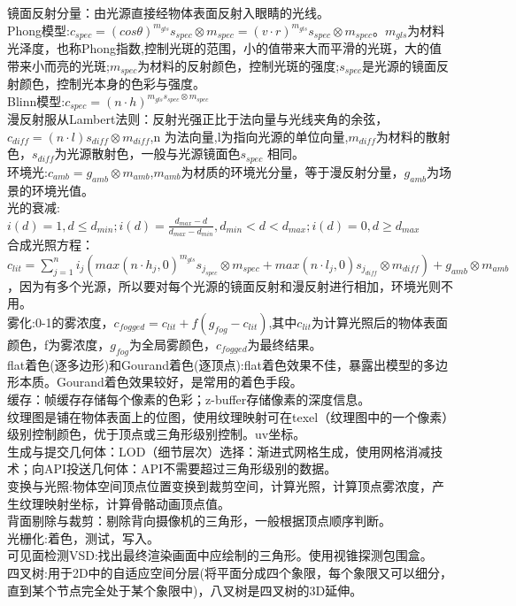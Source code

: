 \documentclass[UTF8]{ctexart}
\begin{document}
镜面反射分量：由光源直接经物体表面反射入眼睛的光线。\\
Phong模型:$c_{spec}=(cos\theta )^{m_{gls}}s_{spec}\otimes m_{spec}=(v\cdot r)^{m_{gls}}s_{spec}\otimes m_{spec}$。$m_{gls}$为材料光泽度，也称Phong指数,控制光斑的范围，小的值带来大而平滑的光斑，大的值带来小而亮的光斑;$m_{spec}$为材料的反射颜色，控制光斑的强度;$s_{spec}$是光源的镜面反射颜色，控制光本身的色彩与强度。\\
Blinn模型:$c_{spec}=(n\cdot h)^{m_{gls}s_{spec}\otimes m_{spec}}$\\
漫反射服从Lambert法则：反射光强正比于法向量与光线夹角的余弦，$c_{diff}=(n\cdot l)s_{diff}\otimes m_{diff}$,n 为法向量,l为指向光源的单位向量,$m_{diff}$为材料的散射色，$s_{diff}$为光源散射色，一般与光源镜面色$s_{spec}$ 相同。\\
环境光:$c_{amb}=g_{amb}\otimes m_{amb}$,$m_{amb}$为材质的环境光分量，等于漫反射分量，$g_{amb}$为场景的环境光值。\\
光的衰减:$i(d)=1, d\leq d_{min}; i(d)=\frac{d_{max}-d}{d_{max}-d_{min}}, d_{min}<d<d_{max}; i(d)=0, d\geq d_{max}$\\
合成光照方程：$c_{lit}=\sum_{j=1}^{n}i_j(max(n\cdot h_j,0)^{m_{gls}}s_{j_{spec}}\otimes m_{spec}+max(n\cdot l_j,0)s_{j_{diff}}\otimes m_{diff})+g_{amb}\otimes m_{amb}$，因为有多个光源，所以要对每个光源的镜面反射和漫反射进行相加，环境光则不用。\\
雾化:0-1的雾浓度，$c_{fogged}=c_{lit}+f(g_{fog}-c_{lit})$,其中$c_{lit}$为计算光照后的物体表面颜色，f为雾浓度，$g_{fog}$为全局雾颜色，$c_{fogged}$为最终结果。\\
flat着色(逐多边形)和Gourand着色(逐顶点):flat着色效果不佳，暴露出模型的多边形本质。Gourand着色效果较好，是常用的着色手段。\\
缓存：帧缓存存储每个像素的色彩；z-buffer存储像素的深度信息。\\
纹理图是铺在物体表面上的位图，使用纹理映射可在texel（纹理图中的一个像素）级别控制颜色，优于顶点或三角形级别控制。uv坐标。\\
生成与提交几何体：LOD（细节层次）选择：渐进式网格生成，使用网格消减技术；向API投送几何体：API不需要超过三角形级别的数据。\\
变换与光照:物体空间顶点位置变换到裁剪空间，计算光照，计算顶点雾浓度，产生纹理映射坐标，计算骨骼动画顶点值。\\
背面剔除与裁剪：剔除背向摄像机的三角形，一般根据顶点顺序判断。\\
光栅化:着色，测试，写入。\\
可见面检测VSD:找出最终渲染画面中应绘制的三角形。使用视锥探测包围盒。\\
四叉树:用于2D中的自适应空间分层(将平面分成四个象限，每个象限又可以细分，直到某个节点完全处于某个象限中)，八叉树是四叉树的3D延伸。\\
\end{document}
